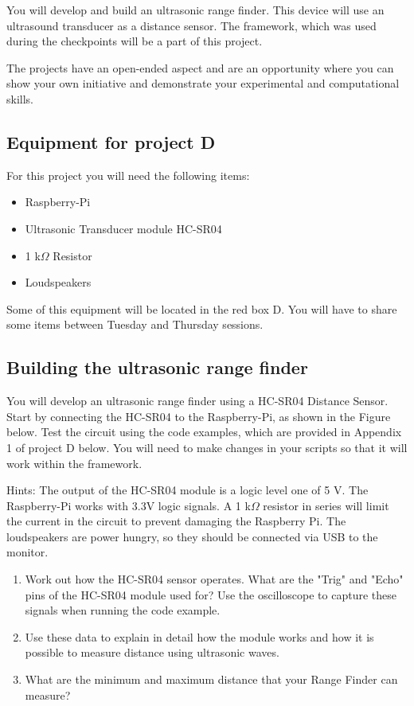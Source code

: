 You will develop and build an ultrasonic range finder. This device will use an ultrasound transducer as a distance sensor. The \webiopi framework, which was used during the checkpoints will be a part of this project. 

The projects have an open-ended aspect and are an opportunity where you can show your own initiative and demonstrate your experimental and computational skills. 

\subsection{Equipment for project D}

For this project you will need the following items:
\begin{itemize}
\item Raspberry-Pi
\item Ultrasonic Transducer module HC-SR04
\item 1 k$\Omega$ Resistor
\item Loudspeakers
\end{itemize}
Some of this equipment will be located in the red box D. You will have to share some items between Tuesday and Thursday sessions. 


\subsection{Building the ultrasonic range finder}
 
You will develop an ultrasonic range finder using a HC-SR04 Distance Sensor. 
Start by connecting the HC-SR04 to the Raspberry-Pi, as shown in the Figure below. Test the circuit using the code examples, which are provided in Appendix 1 of project D below. 
You will need to make changes in your scripts  so that it will work within the \webiopi framework.


Hints: The output of the HC-SR04 module is a logic level one of 5 V. The Raspberry-Pi works with 3.3V logic signals. A 1 k$\Omega$ resistor in series will limit the current in the circuit to prevent damaging the Raspberry Pi. The loudspeakers are power hungry, so they  should be connected  via USB to the 
monitor.
 
\begin{enumerate}
\item 	Work out how the HC-SR04 sensor operates. What are the "Trig" and "Echo" pins of the HC-SR04 module used for? Use the oscilloscope to capture these signals when running the code example. 

\item Use these data to explain in detail how the module works and how it is possible to measure distance using ultrasonic waves.

\item What are the minimum and maximum distance that your Range Finder can measure? 
\end{enumerate}

